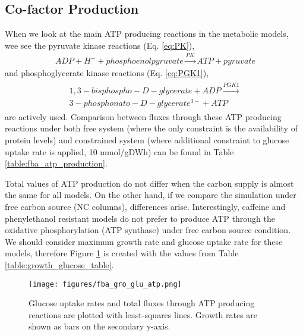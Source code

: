 \subsection{Co-factor Production}
When we look at the main ATP producing reactions in the metabolic models, wee see the pyruvate kinase reactions (Eq. \ref{eq:PK}),
\begin{align}
\label{eq:PK}
\ ADP + H^+ + phosphoenolpyruvate \xrightarrow{PK} ATP + pyruvate
\end{align}
and phosphoglycerate kinase reactions (Eq. \ref{eq:PGK1}),
\begin{align}
\begin{split}
\label{eq:PGK1}
\ 1,3-bisphospho-D-glycerate + ADP  \xrightarrow{PGK1} \\
\ 3-phosphonato-D-glycerate^{3-} + ATP
\end{split}
\end{align}
are actively used. Comparison between fluxes through these ATP producing reactions under both free system (where the only constraint is the availability of protein levels) and constrained system (where additional constraint to glucose uptake rate is applied, 10 mmol/gDWh) can be found in Table \ref{table:fba_atp_production}.

\baselineskip


Total values of ATP production do not differ when the carbon supply is almost the same for all models. On the other hand, if we compare the simulation under free carbon source (NC columns), differences arise. Interestingly, caffeine and phenylethanol resistant models do not prefer to produce ATP through the oxidative phosphorylation (ATP synthase) under free carbon source condition. We should consider maximum growth rate and glucose uptake rate for these models, therefore Figure \ref{fig:fba_gro_glu_atp} is created with the values from Table \ref{table:growth_glucose_table}.

\begin{figure}[H]
  \begin{center}
  \texttt{[image: figures/fba\_gro\_glu\_atp.png]}
  \caption[Glucose uptake rates and total fluxes through ATP producing reactions are plotted with least-squares lines. Growth rates are shown as bar graphs.]{Glucose uptake rates and total fluxes through ATP producing reactions are plotted with least-squares lines. Growth rates are shown as bars on the secondary y-axis.}
  \label{fig:fba_gro_glu_atp}
  \end{center}
\end{figure}

